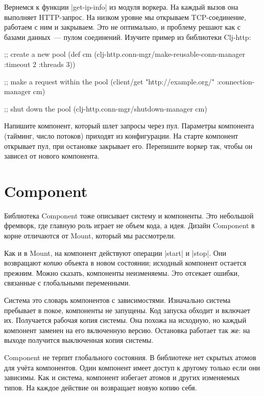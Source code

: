 Вернемся к функции \spverb|get-ip-info| из модуля воркера. На каждый вызов она
выполняет HTTP-запрос. На низком уровне мы открываем TCP-соединение, работаем с
ним и закрываем. Это не оптимально, и проблему решают как с базами данных~---
пулом соединений. Изучите пример из библиотеки
Clj-http:

\begin{english}
  \begin{clojure}
;; create a new pool
(def cm (clj-http.conn-mgr/make-reusable-conn-manager
         {:timeout 2 :threads 3}))

;; make a request within the pool
(client/get "http://example.org/"
            {:connection-manager cm})

;; shut down the pool
(clj-http.conn-mgr/shutdown-manager cm)
  \end{clojure}
\end{english}

Напишите компонент, который шлет запросы через пул. Параметры компонента
(тайминг, число потоков) приходят из конфигурации. На старте компонент открывает
пул, при остановке закрывает его. Перепишите воркер так, чтобы он зависел от
нового компонента.

\section{Component}

Библиотека Component тоже
описывает систему и компоненты. Это небольшой фремворк, где главную роль играет
не объем кода, а идея. Дизайн Component в корне отличаются от Mount, который мы
рассмотрели.

Как и в Mount, на компонент действуют операции \spverb|start| и
\spverb|stop|. Они возвращают \emph{копию} объекта в новом состоянии; исходный
компонент остается прежним. Можно сказать, компоненты неизменяемы. Это отсекает
ошибки, связанные с глобальными переменными.

Система это словарь компонентов с зависимостями. Изначально система пребывает в
покое, компоненты не запущены. Код запуска обходит и включает их. Получается
рабочая копия системы. Она похожа на исходную, но каждый компонент заменен на
его включенную версию. Остановка работает так же: на выходе получится
выключенная копия системы.

Component не терпит глобального состояния. В библиотеке нет скрытых атомов для
уч\"{е}та компонентов. Один компонент имеет доступ к другому только если они
зависимы. Как и система, компонент избегает атомов и других изменяемых типов. На
каждое действие он возвращает новую копию себя.

